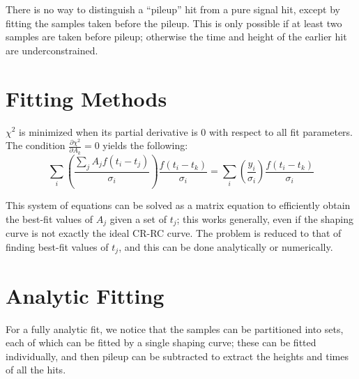 
There is no way to distinguish a ``pileup'' hit from a pure signal hit, except by fitting the samples taken before the pileup. 
This is only possible if at least two samples are taken before pileup; otherwise the time and height of the earlier hit are underconstrained.



\section{Fitting Methods}

$\chi^2$ is minimized when its partial derivative is 0 with respect to all fit parameters. 
The condition $\frac{\partial\chi^2}{\partial A_k}=0$ yields the following:
$$\sum_i\left(\frac{\sum_j A_j f(t_i-t_j)}{\sigma_i}\right)\frac{f(t_i-t_k)}{\sigma_i}= \sum_i\left(\frac{y_i}{\sigma_i}\right)\frac{f(t_i-t_k)}{\sigma_i}$$

This system of equations can be solved as a matrix equation to efficiently obtain the best-fit values of $A_j$ given a set of $t_j$; this works generally, even if the shaping curve is not exactly the ideal CR-RC curve. 
The problem is reduced to that of finding best-fit values of $t_j$, and this can be done analytically or numerically.

\section{Analytic Fitting}
For a fully analytic fit, we notice that the samples can be partitioned into sets, each of which can be fitted by a single shaping curve; 
these can be fitted individually, and then pileup can be subtracted to extract the heights and times of all the hits.

